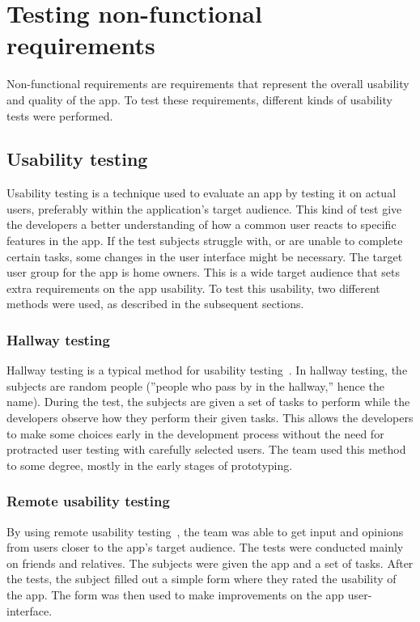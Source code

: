 \section{Testing non-functional requirements}
\label{sec:testingnonfunctionalrequirements}
Non-functional requirements are requirements that represent the overall usability and quality of the app. To test these requirements, different kinds of usability tests were performed.

\subsection{Usability testing}
\label{sec:userTest}
Usability testing is a technique used to evaluate an app by testing it on actual users, preferably within the application's target audience. This kind of test give the developers a better understanding of how a common user reacts to specific features in the app. If the test subjects struggle with, or are unable to complete certain tasks, some changes in the user interface might be necessary.
The target user group for the app is home owners. This is a wide target audience that sets extra requirements on the app usability. To test this usability, two different methods were used, as described in the subsequent sections.

\subsubsection{Hallway testing}
Hallway testing is a typical method for usability testing~\cite{hallwaytesting}. In hallway testing, the subjects are random people (''people who pass by in the hallway,'' hence the name). During the test, the subjects are given a set of tasks to perform while the developers observe how they perform their given tasks. This allows the developers to make some choices early in the development process without the need for protracted user testing with carefully selected users. The team used this method to some degree, mostly in the early stages of prototyping.

\subsubsection{Remote usability testing}
By using remote usability testing~\cite{remoteTest}, the team was able to get input and opinions from users closer to the app's target audience.
The tests were conducted mainly on friends and relatives. The subjects were given the app and a set of tasks. After the tests, the subject filled out a simple form where they rated the usability of the app. The form was then used to make improvements on the app user-interface.

